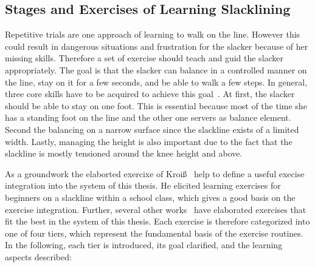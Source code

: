 \subsection{Stages and Exercises of Learning Slacklining}\label{3_3_2_StagesExercises}
Repetitive trials are one approach of learning to walk on the line. However this could result in dangerous situations and frustration for the slacker because of her missing skills. Therefore a set of exercise should teach and guid the slacker appropriately. The goal is that the slacker can balance in a controlled manner on the line, stay on it for a few seconds, and be able to walk a few steps. In general, three core skills have to be acquired to achieve this goal~\cite{Kroiss2007-ab}. At first, the slacker should be able to stay on one foot. This is essential because most of the time she has a standing foot on the line and the other one servers as balance element. Second the balancing on a narrow surface since the slackline exists of a limited width. Lastly, managing the height is also important due to the fact that the slackline is mostly tensioned around the knee height and above.

As a groundwork the elaborted exercixe of Kroiß~\cite{Kroiss2007-ab} help to define a useful execise integration into the system of this thesis. He elicited learning exercises for beginners on a slackline within a school class, which gives a good basis on the exercise integration. Further, several other works~\cite{Balcom2005-wl, Donath2013-kk, Donath2016-gm, Granacher2010-ow, Keller2012-xh, Kleindl2011-bl, Pfusterschmied2013-yy, Thomann2013-aa} have elaborated exercises that fit the best in the system of this thesis. Each exercise is therefore categorized into one of four tiers, which represent the fundamental basis of the exercise routines. In the following, each tier is introduced, its goal clarified, and the learning aspects described:

